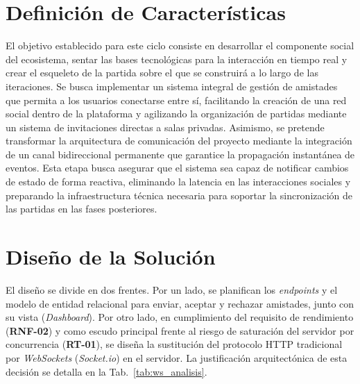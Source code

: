 \section{Definición de Características}
El objetivo establecido para este ciclo consiste en desarrollar el componente social del ecosistema, sentar las bases tecnológicas para la interacción en tiempo real y crear el esqueleto de la partida sobre el que se construirá a lo largo de las iteraciones. Se busca implementar un sistema integral de gestión de amistades que permita a los usuarios conectarse entre sí, facilitando la creación de una red social dentro de la plataforma y agilizando la organización de partidas mediante un sistema de invitaciones directas a salas privadas. Asimismo, se pretende transformar la arquitectura de comunicación del proyecto mediante la integración de un canal bidireccional permanente que garantice la propagación instantánea de eventos. Esta etapa busca asegurar que el sistema sea capaz de notificar cambios de estado de forma reactiva, eliminando la latencia en las interacciones sociales y preparando la infraestructura técnica necesaria para soportar la sincronización de las partidas en las fases posteriores.

\section{Diseño de la Solución}
El diseño se divide en dos frentes. Por un lado, se planifican los \textit{endpoints} y el modelo de entidad relacional para enviar, aceptar y rechazar amistades, junto con su vista (\textit{Dashboard}). Por otro lado, en cumplimiento del requisito de rendimiento (\textbf{RNF-02}) y como escudo principal frente al riesgo de saturación del servidor por concurrencia (\textbf{RT-01}), se diseña la sustitución del protocolo HTTP tradicional por \textit{WebSockets} (\textit{Socket.io}) en el servidor. La justificación arquitectónica de esta decisión se detalla en la Tab.~\ref{tab:ws_analisis}.

